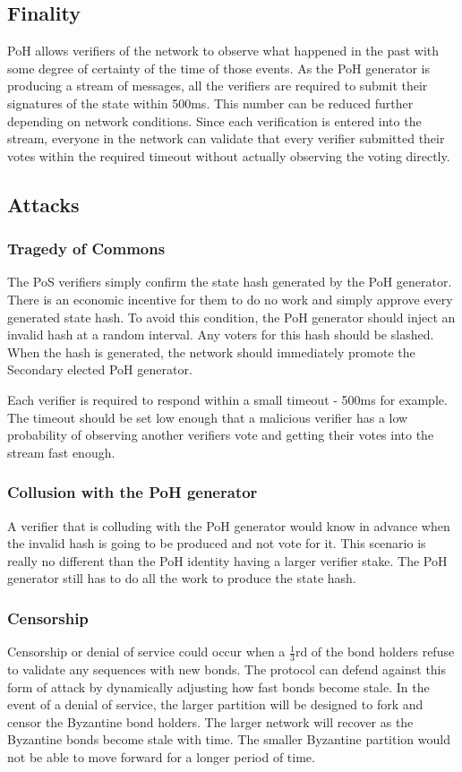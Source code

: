 \documentclass[12pt]{ltjsarticle}
\begin{document}
\subsection{Finality}\label{availability}
PoH allows verifiers of the network to observe what happened in the past with some degree of certainty of the time of those events. As the PoH generator is producing a stream of messages, all the verifiers are required to submit their signatures of the state within 500ms. This number can be reduced further depending on network conditions. Since each verification is entered into the stream, everyone in the network can validate that every verifier submitted their votes within the required timeout without actually observing the voting directly.

\subsection{Attacks}
\subsubsection{Tragedy of Commons}
The PoS verifiers simply confirm the state hash generated by the PoH generator. There is an economic incentive for them to do no work and simply approve every generated state hash. To avoid this condition, the PoH generator should inject an invalid hash at a random interval. Any voters for this hash should be slashed. When the hash is generated, the network should immediately promote the Secondary elected PoH generator.

Each verifier is required to respond within a small timeout - 500ms for example. The timeout should be set low enough that a malicious verifier has a low probability of observing another verifiers vote and getting their votes into the stream fast enough.

\subsubsection{Collusion with the PoH generator}\label{subsubsec:collusion}
A verifier that is colluding with the PoH generator would know in advance when the invalid hash is going to be produced and not vote for it. This scenario is really no different than the PoH identity having a larger verifier stake. The PoH generator still has to do all the work to produce the state hash.

\subsubsection{Censorship}\label{censorship}
Censorship or denial of service could occur when a \(\frac{1}{3}\)rd of the bond holders refuse to validate any sequences with new bonds. The protocol can defend against this form of attack by dynamically adjusting how fast bonds become stale. In the event of a denial of service, the larger partition will be designed to fork and censor the Byzantine bond holders. The larger network will recover as the Byzantine bonds become stale with time. The smaller Byzantine partition would not be able to move forward for a longer period of time.
\end{document}
